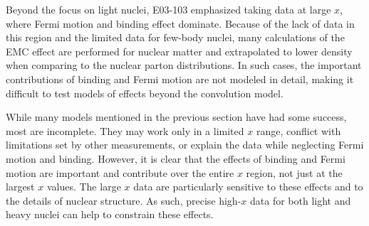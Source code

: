 Beyond the focus on light nuclei, E03-103 emphasized taking data at large $x$,
where Fermi motion and binding effect dominate. Because of the lack of data
in this region and the limited data for few-body nuclei, many calculations of
the EMC effect are performed for nuclear matter and extrapolated to lower
density when comparing to the nuclear parton distributions.  In such cases,
the important contributions of binding and Fermi motion are not modeled
in detail, making it difficult to test models of effects beyond the convolution
model.  

While many models mentioned in the previous section have had some
success, most are incomplete.  They may work only in a limited $x$ range,
conflict with limitations set by other measurements, or explain the data while
neglecting Fermi motion and binding. However, it is clear that the effects of
binding and Fermi motion are important and contribute over the entire $x$
region, not just at the largest $x$ values.  The large $x$ data are
particularly sensitive to these effects and to the details of nuclear
structure.  As such, precise high-$x$ data for both light and heavy nuclei can
help to constrain these effects.

